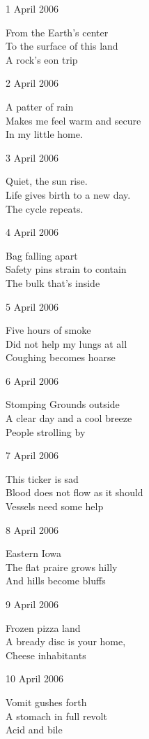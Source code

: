 \documentclass[12pt]{article}
\begin{document}
\newpage

1 April 2006

From the Earth's center \\
To the surface of this land \\
A rock's eon trip

2 April 2006

A patter of rain \\
Makes me feel warm and secure \\
In my little home.

3 April 2006

Quiet, the sun rise. \\
Life gives birth to a new day. \\
The cycle repeats.

4 April 2006

Bag falling apart \\
Safety pins strain to contain \\
The bulk that's inside

5 April 2006

Five hours of smoke \\
Did not help my lungs at all \\
Coughing becomes hoarse

6 April 2006

Stomping Grounds outside \\
A clear day and a cool breeze \\
People strolling by


\newpage

7 April 2006

This ticker is sad \\
Blood does not flow as it should \\
Vessels need some help

8 April 2006

Eastern Iowa \\
The flat praire grows hilly \\
And hills become bluffs

9 April 2006

Frozen pizza land \\
A bready disc is your home, \\
Cheese inhabitants

10 April 2006

Vomit gushes forth \\
A stomach in full revolt \\
Acid and bile
\end{document}
